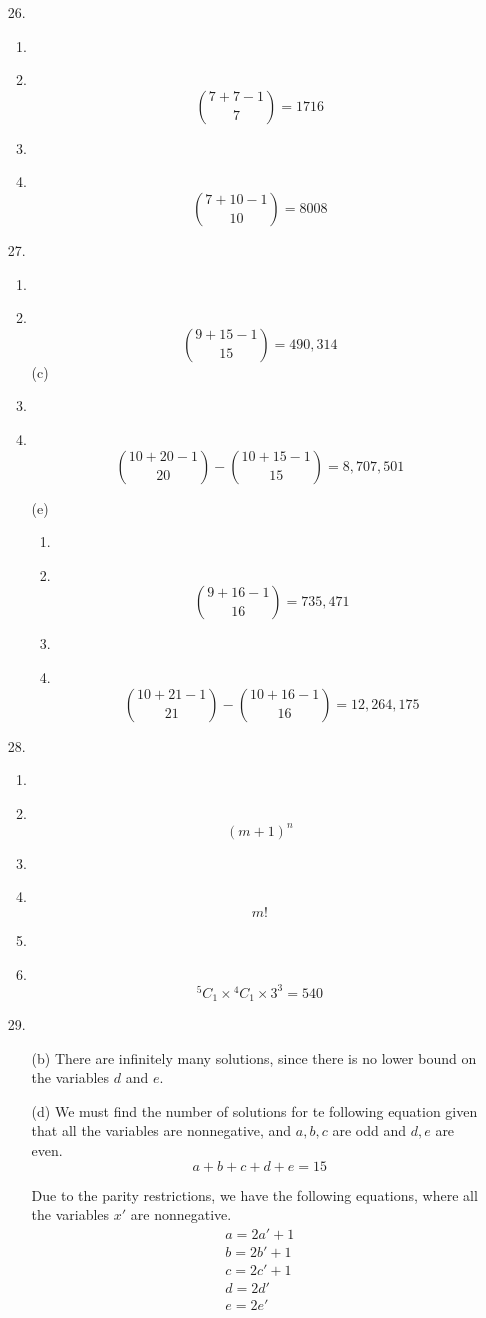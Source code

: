 \documentclass[fleqn]{article}
\newcommand\Item[1][]{ %
  \ifx\relax#1\relax  \item \else \item[#1] \fi
  \abovedisplayskip=0pt\abovedisplayshortskip=0pt~\vspace*{-\baselineskip}
}
\newcommand*{\comb}[2]{{}^{#1}C_{#2}}%
\begin{document}
\begin{enumerate}
	\bigskip
	\item[26.]
	\begin{multicols}{2}
		\begin{enumerate}
			\Item \[\binom{7 + 7 - 1}{7} = 1716\]
			\Item \[\binom{7 + 10 - 1}{10} = 8008\]
		\end{enumerate}
	\end{multicols}

	\bigskip
	\item[27.]
	\begin{multicols}{2}
		\begin{enumerate}
			\Item[(b)] \[\binom{9 + 15 - 1}{15} = 490,314\]
			\Item[(c)] \[\binom{10 + 20 - 1}{20} - \binom{10 + 15 - 1}{15} = 8,707,501\]
		\end{enumerate}
	\end{multicols}
	\begin{enumerate}
		\item[(e)]
		\begin{multicols}{2}
			\begin{enumerate}
				\Item \[\binom{9 + 16 - 1}{16} = 735,471\]
				\Item \[\binom{10 + 21 - 1}{21} - \binom{10 + 16 - 1}{16} = 12,264,175\]
			\end{enumerate}
		\end{multicols}
	\end{enumerate}

	\bigskip
	\item[28.]
	\begin{multicols}{3}
		\begin{enumerate}
			\Item \[{(m + 1)}^n\]
			\Item \[m!\]
			\Item \[\comb{5}{1} \times \comb{4}{1} \times 3^3 = 540\]
		\end{enumerate}
	\end{multicols}

	\bigskip
	\item[29.]
	\begin{enumerate}
		\item[(b)] 
		There are infinitely many solutions, since there is no lower bound on the variables \(d\) and \(e\).
		\item[(d)]
		We must find the number of solutions for te following equation given that all the variables are nonnegative, and \(a, b, c\) are odd and \(d, e\) are even.
		\begin{equation*}
			a + b + c + d + e = 15
		\end{equation*}

		Due to the parity restrictions, we have the following equations, where all the variables \(x'\) are nonnegative.
		\begin{gather*}
			a = 2a' + 1 \\
			b = 2b' + 1 \\
			c = 2c' + 1 \\
			d = 2d' \\
			e = 2e'
		\end{gather*}


\end{enumerate}
\end{enumerate}
\end{document}
